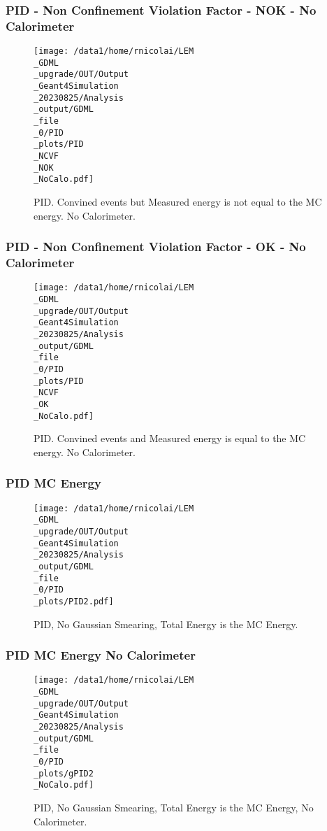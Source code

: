 \documentclass[8pt]{beamer}
\begin{document}
            \begin{frame}
                \frametitle{PID - Non Confinement Violation Factor - NOK - No Calorimeter}
            
        \begin{figure}[h]
            \centering
            \texttt{[image: /data1/home/rnicolai/LEM\\\_GDML\\\_upgrade/OUT/Output\\\_Geant4Simulation\\\_20230825/Analysis\\\_output/GDML\\\_file\\\_0/PID\\\_plots/PID\\\_NCVF\\\_NOK\\\_NoCalo.pdf]}
            \caption{PID. Convined events but Measured energy is not equal to the MC energy. No Calorimeter.}
        \end{figure}
        
            \end{frame}
            
            \begin{frame}
                \frametitle{PID - Non Confinement Violation Factor - OK - No Calorimeter}
            
        \begin{figure}[h]
            \centering
            \texttt{[image: /data1/home/rnicolai/LEM\\\_GDML\\\_upgrade/OUT/Output\\\_Geant4Simulation\\\_20230825/Analysis\\\_output/GDML\\\_file\\\_0/PID\\\_plots/PID\\\_NCVF\\\_OK\\\_NoCalo.pdf]}
            \caption{PID. Convined events and Measured energy is equal to the MC energy. No Calorimeter.}
        \end{figure}
        
            \end{frame}
            
            \begin{frame}
                \frametitle{PID MC Energy}
            
        \begin{figure}[h]
            \centering
            \texttt{[image: /data1/home/rnicolai/LEM\\\_GDML\\\_upgrade/OUT/Output\\\_Geant4Simulation\\\_20230825/Analysis\\\_output/GDML\\\_file\\\_0/PID\\\_plots/PID2.pdf]}
            \caption{PID, No Gaussian Smearing, Total Energy is the MC Energy.}
        \end{figure}
        
            \end{frame}
            
            \begin{frame}
                \frametitle{PID MC Energy No Calorimeter}
            
        \begin{figure}[h]
            \centering
            \texttt{[image: /data1/home/rnicolai/LEM\\\_GDML\\\_upgrade/OUT/Output\\\_Geant4Simulation\\\_20230825/Analysis\\\_output/GDML\\\_file\\\_0/PID\\\_plots/gPID2\\\_NoCalo.pdf]}
            \caption{PID, No Gaussian Smearing, Total Energy is the MC Energy, No Calorimeter.}
        \end{figure}
        
            \end{frame}
            
\end{document}

